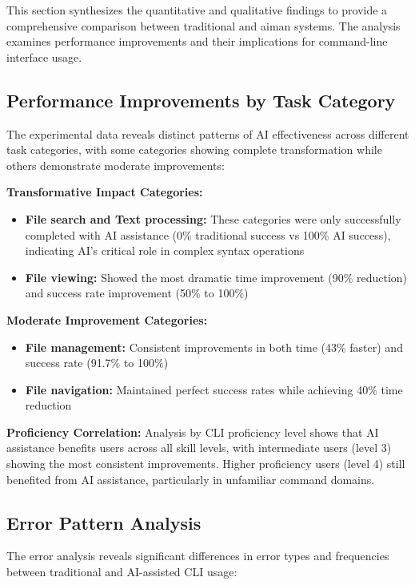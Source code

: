This section synthesizes the quantitative and qualitative findings to provide a comprehensive comparison between traditional and aiman systems. The analysis examines performance improvements and their implications for command-line interface usage.

\subsection{Performance Improvements by Task Category}

The experimental data reveals distinct patterns of AI effectiveness across different task categories, with some categories showing complete transformation while others demonstrate moderate improvements:

\textbf{Transformative Impact Categories:}
\begin{itemize}
	\item \textbf{File search and Text processing:} These categories were only successfully completed with AI assistance (0\% traditional success vs 100\% AI success), indicating AI's critical role in complex syntax operations
	\item \textbf{File viewing:} Showed the most dramatic time improvement (90\% reduction) and success rate improvement (50\% to 100\%)
\end{itemize}

\textbf{Moderate Improvement Categories:}
\begin{itemize}
	\item \textbf{File management:} Consistent improvements in both time (43\% faster) and success rate (91.7\% to 100\%)
	\item \textbf{File navigation:} Maintained perfect success rates while achieving 40\% time reduction
\end{itemize}

\textbf{Proficiency Correlation:} Analysis by CLI proficiency level shows that AI assistance benefits users across all skill levels, with intermediate users (level 3) showing the most consistent improvements. Higher proficiency users (level 4) still benefited from AI assistance, particularly in unfamiliar command domains.

\subsection{Error Pattern Analysis}

The error analysis reveals significant differences in error types and frequencies between traditional and AI-assisted CLI usage:

